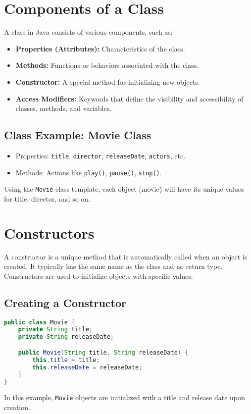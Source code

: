 \documentclass{article}
\begin{document}
\section{Components of a Class}
A class in Java consists of various components, such as:
\begin{itemize}
    \item \textbf{Properties (Attributes):} Characteristics of the class.
    \item \textbf{Methods:} Functions or behaviors associated with the class.
    \item \textbf{Constructor:} A special method for initializing new objects.
    \item \textbf{Access Modifiers:} Keywords that define the visibility and accessibility of classes, methods, and variables.
\end{itemize}

\subsection{Class Example: Movie Class}
\begin{itemize}
    \item Properties: \texttt{title}, \texttt{director}, \texttt{releaseDate}, \texttt{actors}, etc.
    \item Methods: Actions like \texttt{play()}, \texttt{pause()}, \texttt{stop()}.
\end{itemize}
Using the \texttt{Movie} class template, each object (movie) will have its unique values for title, director, and so on. 

\section{Constructors}
A constructor is a unique method that is automatically called when an object is created. It typically has the same name as the class and no return type. Constructors are used to initialize objects with specific values.

\subsection{Creating a Constructor}
\begin{lstlisting}[language=Java]
public class Movie {
    private String title;
    private String releaseDate;

    public Movie(String title, String releaseDate) {
        this.title = title;
        this.releaseDate = releaseDate;
    }
}
\end{lstlisting}
In this example, \texttt{Movie} objects are initialized with a title and release date upon creation.
\end{document}
